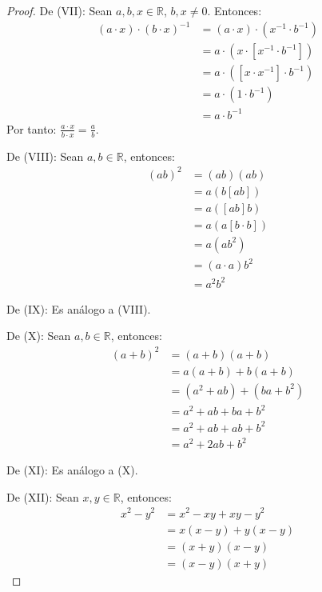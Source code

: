 \documentclass[12pt]{article}
\begin{document}
\begin{enumerate}
\begin{proof}
        De (VII): Sean $a,b,x\in\mathbb{R}$, $b,x\neq0$. Entonces:
        \begin{equation*}
            \begin{split}
                (a\cdot x)\cdot(b\cdot x)^{-1}&=(a\cdot x)\cdot(x^{-1}\cdot b^{-1})\\
                &=a\cdot(x\cdot[x^{-1}\cdot b^{-1}])\\
                &=a\cdot([x\cdot x^{-1}]\cdot b^{-1})\\
                &=a\cdot(1\cdot b^{-1})\\
                &=a\cdot b^{-1}
            \end{split}
        \end{equation*}
        Por tanto: $\frac{a\cdot x}{b \cdot x}=\frac{a}{b}$.

        De (VIII): Sean $a,b\in\mathbb{R}$, entonces:
        \begin{equation*}
            \begin{split}
                (ab)^2&=(ab)(ab)\\
                &=a(b[ab])\\
                &=a([ab]b)\\
                &=a(a[b\cdot b])\\
                &=a(ab^2)\\
                &=(a\cdot a)b^2\\
                &=a^2b^2
            \end{split}
        \end{equation*}

        De (IX): Es análogo a (VIII).

        De (X): Sean $a,b\in\mathbb{R}$, entonces:
        \begin{equation*}
            \begin{split}
                (a+b)^2&=(a+b)(a+b)\\
                &=a(a+b)+b(a+b)\\
                &=(a^2+ab)+(ba+b^2)\\
                &=a^2+ab+ba+b^2\\
                &=a^2+ab+ab+b^2\\
                &=a^2+2ab+b^2
            \end{split}
        \end{equation*}

        De (XI): Es análogo a (X).

        De (XII): Sean $x,y\in\mathbb{R}$, entonces:
        \begin{equation*}
            \begin{split}
                x^2-y^2&=x^2-xy+xy-y^2\\
                &=x(x-y)+y(x-y)\\
                &=(x+y)(x-y)\\
                &=(x-y)(x+y)
            \end{split}
        \end{equation*}


\end{proof}
\end{enumerate}
\end{document}
